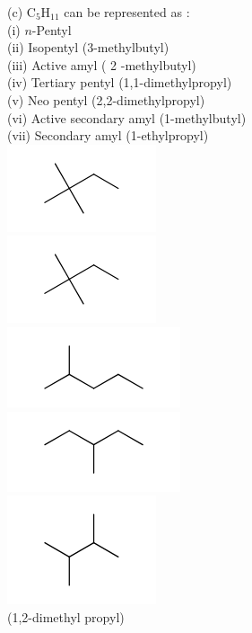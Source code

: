 \documentclass[10pt]{article}
\begin{document}
(c) $\mathrm{C}_{5} \mathrm{H}_{11}$ can be represented as :\\
(i) $n$-Pentyl\\
(ii) Isopentyl (3-methylbutyl)\\
(iii) Active amyl ( 2 -methylbutyl)\\
(iv) Tertiary pentyl (1,1-dimethylpropyl)\\
(v) Neo pentyl (2,2-dimethylpropyl)\\
(vi) Active secondary amyl (1-methylbutyl)\\
(vii) Secondary amyl (1-ethylpropyl)\\
\includegraphics{smile-8274e4bb2805fc05d4ab72e237aa728afc1649c2}\\
\includegraphics{smile-a11cf87c85f8adebb294eecf7acec3028fe902c2}\\
\includegraphics{smile-658c8c4f6597d53731c9ea130c204aea17736299}\\
\includegraphics{smile-decea1135af0a11aae3824d452c96e15635d1f05}\\
\includegraphics{smile-5e3b3a728e991a3498a7486f08739f4daa1825b0}\\
(1,2-dimethyl propyl)
\end{document}

